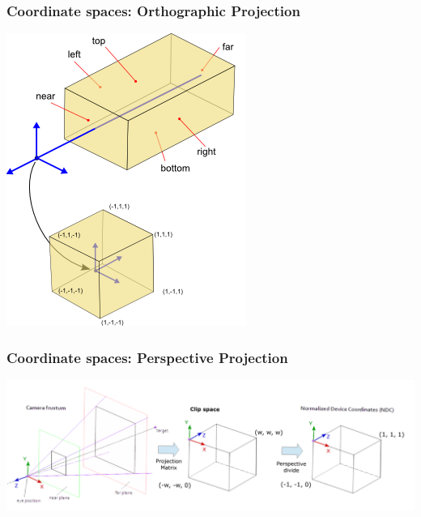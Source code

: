 \documentclass{beamer}
\begin{document}
\begin{frame}
    \frametitle{Coordinate spaces: Orthographic Projection}

    \begin{center}
        \includegraphics[scale=0.66]{images/q5-glortho.png}
    \end{center}

\end{frame}

\begin{frame}
    \frametitle{Coordinate spaces: Perspective Projection}

    \begin{center}
        \includegraphics[scale=0.33]{images/q5-coordinate-spaces.png}
    \end{center}

\end{frame}
\end{document}
